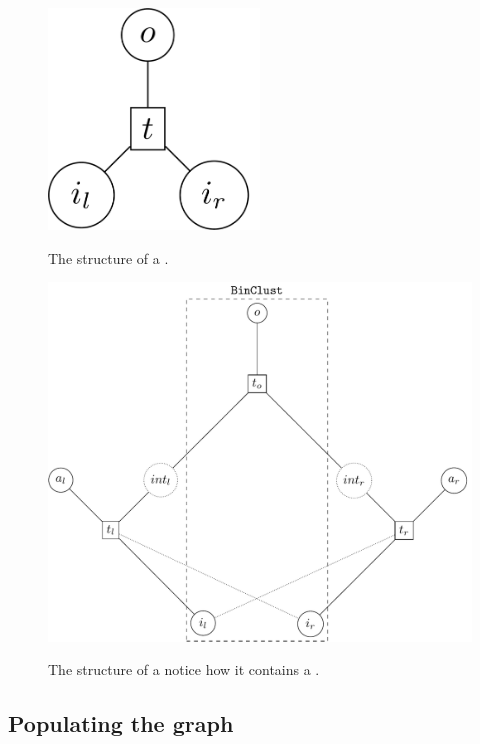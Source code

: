 \begin{figure}[H]
  \centering
  \includegraphics[width=0.5\textwidth]{./imgs/binclust.pdf}
  \label{fig:binclust}
  \caption{The structure of a .}
\end{figure}


\begin{figure}[H]
  \centering
  \includegraphics[width=.9\linewidth]{./imgs/joinclust.pdf}
  \label{fig:joinclust}
  \caption{The structure of a 
    notice how it contains a .}
\end{figure}

\subsection{Populating the graph}


